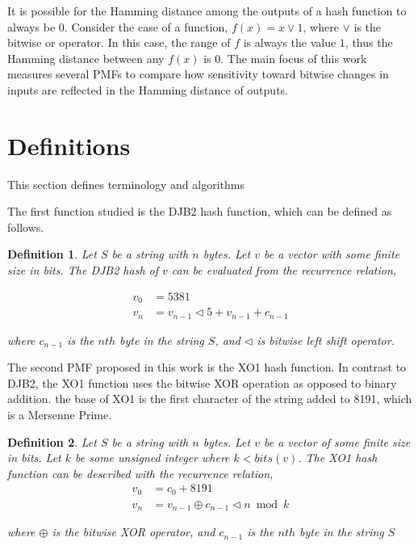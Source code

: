 \documentclass{article}
\newtheorem{definition}{Definition}[subsection]
\begin{document}
It is possible for the Hamming distance among the outputs of a hash function to always be $0$. Consider the case of a function, $f(x) = x \lor 1$, where $\lor$ is the bitwise or operator. In this case, the range of $f$ is always the value $1$, thus the Hamming distance between any $f(x)$ is $0$. The main focus of this work measures several PMFs to compare how sensitivity toward bitwise changes in inputs are reflected in the Hamming distance of outputs.

\section{Definitions}

This section defines terminology and algorithms 

The first function studied is the DJB2 hash function, which can be defined as follows.

\begin{definition}

Let $S$ be a string with $n$ bytes. Let $v$ be a vector with some finite size in bits. The DJB2 hash of $v$ can be evaluated from the recurrence relation,

\begin{align*}
    v_0 &= 5381 \\
    v_n &= v_{n-1} \triangleleft 5 + v_{n-1} + c_{n-1} 
\end{align*}

where $c_{n-1}$ is the $nth$ byte in the string $S$, and $\triangleleft$ is bitwise left shift operator.

\end{definition}

The second PMF proposed in this work is the XO1 hash function. In contrast to DJB2, the XO1 function uses the bitwise XOR operation as opposed to binary addition. the base of XO1 is the first character of the string added to 8191, which is a Mersenne Prime\citep{robinson1954mersenne}.



\begin{definition}
Let $S$ be a string with $n$ bytes. Let $v$ be a vector of some finite size in bits. Let $k$ be some unsigned integer where $k < bits(v)$. The XO1 hash function can be described with the recurrence relation,
\begin{align*}
    v_0 &= c_0 + 8191 \\
    v_n &= v_{n-1} \oplus c_{n-1} \triangleleft n \bmod k
\end{align*}

where $\oplus$ is the bitwise XOR operator, and $c_{n-1}$ is the $nth$ byte in the string $S$
\end{definition}
\end{document}
